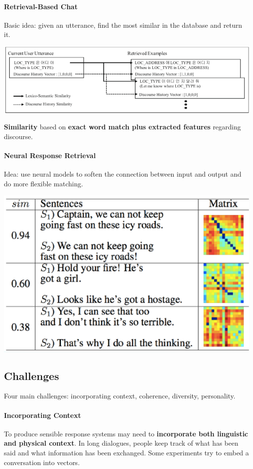 \documentclass[10pt]{report}
\begin{document}
\paragraph{Retrieval-Based Chat} Basic idea: given an utterance, find the most similar in the database and return it.
\begin{center}
	\includegraphics[scale=0.5]{133.png}
\end{center}
\textbf{Similarity} based on \textbf{exact word match plus extracted features} regarding discourse.
\paragraph{Neural Response Retrieval} Idea: use neural models to soften the connection between input and output and do more flexible matching.
\begin{center}
	\includegraphics[scale=0.33]{134.png}
\end{center}
\subsection{Challenges}
Four main challenges: incorporating context, coherence, diversity, personality.
\paragraph{Incorporating Context} To produce sensible response systems may need to \textbf{incorporate both linguistic and physical context}. In long dialogues, people keep track of what has been said and what information has been exchanged. Some experiments try to embed a conversation into vectors.
\end{document}

